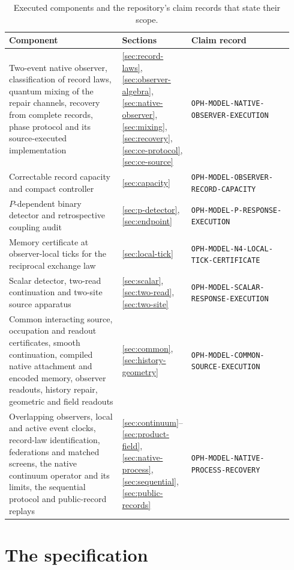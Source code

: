 \documentclass[11pt]{article}
\theoremstyle{definition}
\theoremstyle{remark}
\theoremstyle{plain}
\begin{document}
\begin{table}[htbp]
\centering
\footnotesize
\caption{Executed components and the repository's claim records that state
their scope.}
\label{tab:registry}
\begin{tabular}{@{}L{0.42\linewidth}L{0.14\linewidth}L{0.38\linewidth}@{}}
\toprule
\textbf{Component} & \textbf{Sections} & \textbf{Claim record}\\
\midrule
Two-event native observer, classification of record laws, quantum mixing of
the repair channels, recovery from complete records, phase protocol and its
source-executed implementation &
\ref{sec:record-laws}, \ref{sec:observer-algebra}, \ref{sec:native-observer}, \ref{sec:mixing},
\ref{sec:recovery}, \ref{sec:ce-protocol}, \ref{sec:ce-source} &
\texttt{OPH-MODEL-NATIVE-OBSERVER-EXECUTION}\\
Correctable record capacity and compact controller &
\ref{sec:capacity} & \texttt{OPH-MODEL-OBSERVER-RECORD-CAPACITY}\\
$P$-dependent binary detector and retrospective coupling audit &
\ref{sec:p-detector}, \ref{sec:endpoint} &
\texttt{OPH-MODEL-P-RESPONSE-EXECUTION}\\
Memory certificate at observer-local ticks for the reciprocal exchange law &
\ref{sec:local-tick} & \texttt{OPH-MODEL-N4-LOCAL-TICK-CERTIFICATE}\\
Scalar detector, two-read continuation and two-site source apparatus &
\ref{sec:scalar}, \ref{sec:two-read}, \ref{sec:two-site} &
\texttt{OPH-MODEL-SCALAR-RESPONSE-EXECUTION}\\
Common interacting source, occupation and readout certificates, smooth
continuation, compiled native attachment and encoded memory, observer
readouts, history repair, geometric and field readouts &
\ref{sec:common}, \ref{sec:history-geometry} &
\texttt{OPH-MODEL-COMMON-SOURCE-EXECUTION}\\
Overlapping observers, local and active event clocks, record-law
identification, federations and matched screens, the native continuum
operator and its limits, the sequential protocol and public-record replays &
\ref{sec:continuum}--\ref{sec:product-field}, \ref{sec:native-process},
\ref{sec:sequential}, \ref{sec:public-records} &
\texttt{OPH-MODEL-NATIVE-PROCESS-RECOVERY}\\
\bottomrule
\end{tabular}
\end{table}

\section{The specification}
\label{sec:spec}
\end{document}
